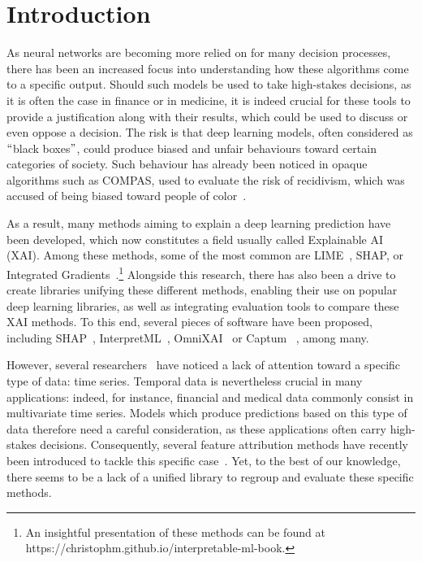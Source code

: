 \section{Introduction}
\label{sec:introduction}

As neural networks are becoming more relied on for many decision processes, there has been an increased focus into
understanding how these algorithms come to a specific output.
Should such models be used to take high-stakes decisions, as it is often the case in finance or in medicine, it is
indeed crucial for these tools to provide a justification along with their results, which could be used to discuss
or even oppose a decision.
The risk is that deep learning models, often considered as $``$black boxes$"$, could produce biased and unfair behaviours
toward certain categories of society.
Such behaviour has already been noticed in opaque algorithms such as COMPAS, used to evaluate the risk of recidivism,
which was accused of being biased toward people of color~\citep{rudin2019stop}.

As a result, many methods aiming to explain a deep learning prediction have been developed, which now constitutes a
field usually called Explainable AI (XAI).
Among these methods, some of the most common are LIME~\citep{ribeiro2016should}, SHAP\citep{lundberg2017unified}, 
or Integrated Gradients~\citep{sundararajan2017axiomatic}.\footnote{
    An insightful presentation of these methods can be found at https://christophm.github.io/interpretable-ml-book.
}
Alongside this research, there has also been a drive to create libraries unifying these different methods, enabling
their use on popular deep learning libraries, as well as integrating evaluation tools to compare these XAI methods.
To this end, several pieces of software have been proposed, including SHAP~\citep{lundberg2017unified},
InterpretML~\citep{nori2019interpretml}, OmniXAI~\citep{wenzhuo2022-omnixai} or Captum~\citep{kokhlikyan2020captum}
, among many.

However, several researchers~\citep{tonekaboni2020went, crabbe2021explaining} have noticed a lack of attention toward
a specific type of data: time series.
Temporal data is nevertheless crucial in many applications: indeed, for instance, financial and medical data commonly
consist in multivariate time series.
Models which produce predictions based on this type of data therefore need a careful consideration, as these
applications often carry high-stakes decisions.
Consequently, several feature attribution methods have recently been introduced to tackle this specific
case~\citep{choi2016retain, tonekaboni2020went, crabbe2021explaining}.
Yet, to the best of our knowledge, there seems to be a lack of a unified library to regroup and evaluate these specific
methods.

